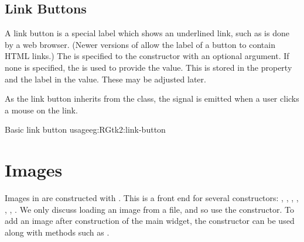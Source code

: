 \subsection{Link Buttons}
\label{sec:link-buttons}

A link button is a special label which shows an underlined link, such
as is done by a web browser. (Newer versions of \GTK\/ allow the label
of a button to contain HTML links.) The  is specified to the
 constructor with an optional
 argument. If none is specified, the
 is used to provide the value. This  is stored in
the  property and the label in the  value. These
may be adjusted later.

As the link button inherits from the  class, the
 signal is emitted when a user clicks a mouse on the link.

\begin{example}{Basic link button usage}{eg:RGtk2:link-button}
\begin{Schunk}
\end{Schunk}
\end{example}


\section{Images}
\label{sec:RGtk2:images}

Images in  are constructed with
. This is a front end for several constructors:
,
,
, ,
,
,
. We only discuss loading an
image from a file, and so use the 
constructor. To add an image after construction of the main widget,
the  constructor can be used along with
methods such as .

